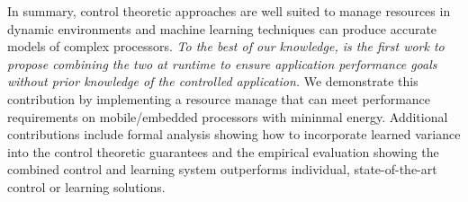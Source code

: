 In summary, control theoretic approaches are well suited to manage
resources in dynamic environments and machine learning techniques can
produce accurate models of complex processors.  \emph{To the best of
  our knowledge, \SYSTEM{} is the first work to propose combining the
  two at runtime to ensure application performance goals without prior
  knowledge of the controlled application.}  We demonstrate this
contribution by implementing a resource manage that can meet
performance requirements on mobile/embedded processors with mininmal
energy.  Additional contributions include formal analysis showing how
to incorporate learned variance into the control theoretic guarantees
and the empirical evaluation showing the combined control and learning
system outperforms individual, state-of-the-art control or learning
solutions.



